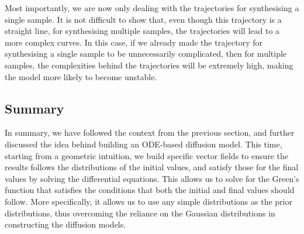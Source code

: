 Most importantly, we are now only dealing with the trajectories for synthesising a single sample. It is not difficult to show that, even though this trajectory is a straight line, for synthesising multiple samples, the trajectories will lead to a more  complex curves. In this case, if we already made the trajectory for synthesising a single sample to be unnecessarily complicated, then for multiple samples, the complexities behind the trajectories will be extremely high, making the model more likely to become unstable.

\subsection{Summary}
In summary, we have followed the context from the previous section, and further discussed the idea behind building an ODE-based diffusion model. This time, starting from a geometric intuition, we build specific vector fields to ensure the results follows the distributions of the initial values, and satisfy those for the final values by solving the differential equations. This allows us to solve for the Green's function that satisfies the conditions that both the initial and final values should follow. More specifically, it allows us to use any simple distributions as the prior distributions, thus overcoming the reliance on the Gaussian distributions in constructing the diffusion models.

